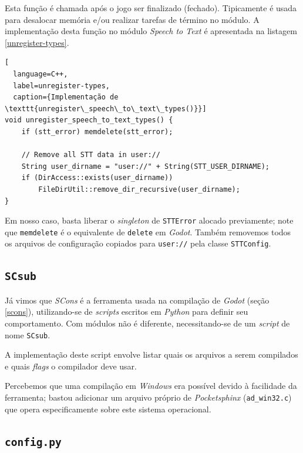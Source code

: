 Esta função é chamada após o jogo ser finalizado (fechado). Tipicamente é usada para desalocar memória e/ou realizar tarefas de término no módulo. A implementação desta função no módulo \textit{Speech to Text} é apresentada na listagem \ref{unregister-types}.

\begin{lstlisting}[
  language=C++,
  label=unregister-types,
  caption={Implementação de \texttt{unregister\_speech\_to\_text\_types()}}]
void unregister_speech_to_text_types() {
    if (stt_error) memdelete(stt_error);

    // Remove all STT data in user://
    String user_dirname = "user://" + String(STT_USER_DIRNAME);
    if (DirAccess::exists(user_dirname))
        FileDirUtil::remove_dir_recursive(user_dirname);
}
\end{lstlisting}

Em nosso caso, basta liberar o \textit{singleton} de \texttt{STTError} alocado previamente; note que \texttt{memdelete} é o equivalente de \texttt{delete} em \textit{Godot}. Também removemos todos os arquivos de configuração copiados para \texttt{user://} pela classe \texttt{STTConfig}.


\subsection{\texttt{SCsub}}

Já vimos que \textit{SCons} é a ferramenta usada na compilação de \textit{Godot} (seção \ref{scons}), utilizando-se de \textit{scripts} escritos em \textit{Python} para definir seu comportamento. Com módulos não é diferente, necessitando-se de um \textit{script} de nome \texttt{SCsub}.

A implementação deste script envolve listar quais os arquivos a serem compilados e quais \textit{flags} o compilador deve usar.

Percebemos que uma compilação em \textit{Windows} era possível devido à facilidade da ferramenta; bastou adicionar um arquivo próprio de \textit{Pocketsphinx} (\texttt{ad\_win32.c}) que opera especificamente sobre este sistema operacional.


\subsection{\texttt{config.py}}

